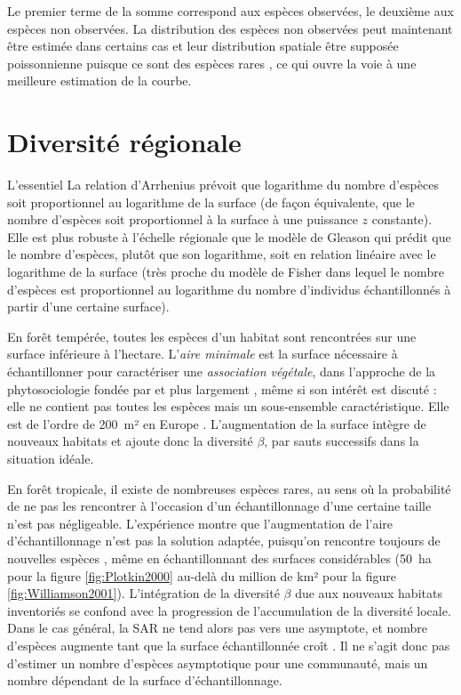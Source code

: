 \documentclass[
  11pt,
  french,
  a4paper,
  extrafontsizes,onecolumn,openright
  ]{memoir}
\newenvironment{Essentiel}
  {\begin{bclogo}[logo=\bctrombone, noborder=true, couleur=lightgray!50]{L'essentiel}\parindent0pt}
  {\end{bclogo}}
\begin{document}
Le premier terme de la somme correspond aux espèces observées, le deuxième aux espèces non observées.
La distribution des espèces non observées peut maintenant être estimée dans certains cas \autocite{Chao2014c} et leur distribution spatiale être supposée poissonnienne puisque ce sont des espèces rares \autocite{Picard2004}, ce qui ouvre la voie à une meilleure estimation de la courbe.

\hypertarget{diversituxe9-ruxe9gionale}{%
\chapter{Diversité régionale}\label{diversituxe9-ruxe9gionale}}

\scriptsize

\begin{Essentiel}
La relation d'Arrhenius prévoit que logarithme du nombre d'espèces soit
proportionnel au logarithme de la surface (de façon équivalente, que le
nombre d'espèces soit proportionnel à la surface à une puissance \(z\)
constante). Elle est plus robuste à l'échelle régionale que le modèle de
Gleason qui prédit que le nombre d'espèces, plutôt que son logarithme,
soit en relation linéaire avec le logarithme de la surface (très proche
du modèle de Fisher dans lequel le nombre d'espèces est proportionnel au
logarithme du nombre d'individus échantillonnés à partir d'une certaine
surface).
\end{Essentiel}

\normalsize

En forêt tempérée, toutes les espèces d'un habitat sont rencontrées sur une surface inférieure à l'hectare.
L'\emph{aire minimale} est la surface nécessaire à échantillonner pour caractériser une \emph{association végétale}, dans l'approche de la phytosociologie fondée par \textcite{Braun-Blanquet1928} et plus largement \autocite{Greig-Smith1983}, même si son intérêt est discuté \autocite{McGuinness1984}: elle ne contient pas toutes les espèces mais un sous-ensemble caractéristique.
Elle est de l'ordre de 200~m² en Europe \autocite{Chytry2003}.
L'augmentation de la surface intègre de nouveaux habitats et ajoute donc la diversité \(\beta\), par sauts successifs dans la situation idéale.

En forêt tropicale, il existe de nombreuses espèces rares, au sens où la probabilité de ne pas les rencontrer à l'occasion d'un échantillonnage d'une certaine taille n'est pas négligeable.
L'expérience montre que l'augmentation de l'aire d'échantillonnage n'est pas la solution adaptée, puisqu'on rencontre toujours de nouvelles espèces \autocite{Gotelli2001}, même en échantillonnant des surfaces considérables (50~ha pour la figure \ref{fig:Plotkin2000} au-delà du million de km² pour la figure \ref{fig:Williamson2001}).
L'intégration de la diversité \(\beta\) due aux nouveaux habitats inventoriés se confond avec la progression de l'accumulation de la diversité locale.
Dans le cas général, la SAR ne tend alors pas vers une asymptote, et nombre d'espèces augmente tant que la surface échantillonnée croît \autocite{Williamson2001}.
Il ne s'agit donc pas d'estimer un nombre d'espèces asymptotique pour une communauté, mais un nombre dépendant de la surface d'échantillonnage.
\end{document}
